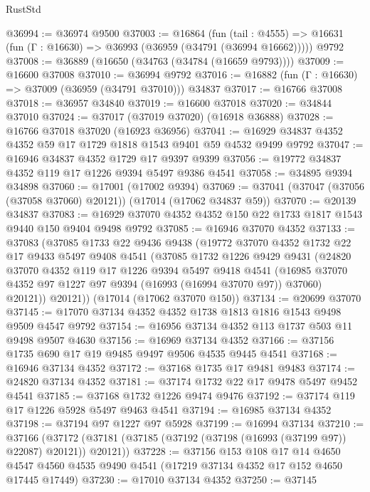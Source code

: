 \begin{lexlean}{RustStd}
\begin{coremodule}
{\begin{coremodule}
{{{{{{{{{{{{{{{{{{{{{{{{{{{{{{{{{{{{{{{{{{{{{{{{{{{{{{{@36994 := @36974 @9500
@37003 := @16864
    (fun (tail : @4555) => @16631 (fun (Γ : @16630) => @36993 (@36959 (@34791 (@36994 @16662)))))
    @9792
@37008 := @36889 (@16650 (@34763 (@34784 (@16659 @9793))))
@37009 := @16600 @37008
@37010 := @36994 @9792
@37016 := @16882 (fun (Γ : @16630) => @37009 (@36959 (@34791 @37010))) @34837
@37017 := @16766 @37008
@37018 := @36957 @34840
@37019 := @16600 @37018
@37020 := @34844 @37010
@37024 := @37017 (@37019 @37020) (@16918 @36888)
@37028 := @16766 @37018 @37020 (@16923 @36956)
@37041 := @16929 @34837 @4352 @4352 @59 @17 @1729 @1818 @1543 @9401 @59 @4532 @9499 @9792
@37047 := @16946 @34837 @4352 @1729 @17 @9397 @9399
@37056 := @19772 @34837 @4352 @119 @17 @1226 @9394 @5497 @9386 @4541
@37058 := @34895 @9394 @34898
@37060 := @17001 (@17002 @9394)
@37069 := @37041 (@37047 (@37056 (@37058 @37060) @20121)) (@17014 (@17062 @34837 @59))
@37070 := @20139 @34837
@37083 := @16929 @37070 @4352 @4352 @150 @22 @1733 @1817 @1543 @9440 @150 @9404 @9498 @9792
@37085 := @16946 @37070 @4352
@37133 := @37083
    (@37085
      @1733
      @22
      @9436
      @9438
      (@19772
        @37070
        @4352
        @1732
        @22
        @17
        @9433
        @5497
        @9408
        @4541
        (@37085
          @1732
          @1226
          @9429
          @9431
          (@24820
            @37070
            @4352
            @119
            @17
            @1226
            @9394
            @5497
            @9418
            @4541
            (@16985 @37070 @4352 @97 @1227 @97 @9394 (@16993 (@16994 @37070 @97)) @37060)
            @20121))
        @20121))
    (@17014 (@17062 @37070 @150))
@37134 := @20699 @37070
@37145 := @17070 @37134 @4352 @4352 @1738 @1813 @1816 @1543 @9498 @9509 @4547 @9792
@37154 := @16956 @37134 @4352 @113 @1737 @503 @11 @9498 @9507 @4630
@37156 := @16969 @37134 @4352
@37166 := @37156 @1735 @690 @17 @19 @9485 @9497 @9506 @4535 @9445 @4541
@37168 := @16946 @37134 @4352
@37172 := @37168 @1735 @17 @9481 @9483
@37174 := @24820 @37134 @4352
@37181 := @37174 @1732 @22 @17 @9478 @5497 @9452 @4541
@37185 := @37168 @1732 @1226 @9474 @9476
@37192 := @37174 @119 @17 @1226 @5928 @5497 @9463 @4541
@37194 := @16985 @37134 @4352
@37198 := @37194 @97 @1227 @97 @5928
@37199 := @16994 @37134
@37210 := @37166
    (@37172 (@37181 (@37185 (@37192 (@37198 (@16993 (@37199 @97)) @22087) @20121)) @20121))
@37228 := @37156
    @153
    @108
    @17
    @14
    @4650
    @4547
    @4560
    @4535
    @9490
    @4541
    (@17219 @37134 @4352 @17 @152 @4650 @17445 @17449)
@37230 := @17010 @37134 @4352
@37250 := @37145
}}}}}}}}}}}}}}}}}}}}}}}}}}}}}}}}}}}}}}}}}}}}}}}}}}}}}}}
\end{coremodule}}
\end{coremodule}
\end{lexlean}
